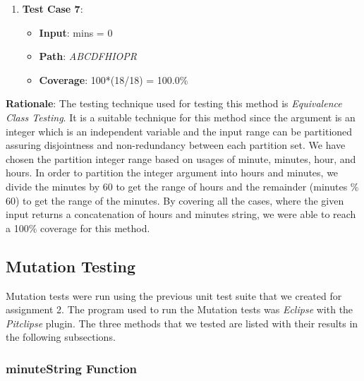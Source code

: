 \documentclass[fontsize=12pt,paper=letter,twoside]{scrartcl}
\begin{document}
\begin{enumerate}
\item \textbf{Test Case 7}:
\begin{itemize}
\item \textbf{Input}: mins = 0
\item \textbf{Path}: \emph{ABCDFHIOPR}
\item \textbf{Coverage}: 100*(18/18) = 100.0\%
\end{itemize}

\end{enumerate}

\noindent \textbf{Rationale}: The testing technique used for testing this method is \emph{Equivalence Class Testing}. It is a suitable technique for this method since the argument is an integer which is an independent variable and the input range can be partitioned assuring disjointness and non-redundancy between each partition set. We have chosen the partition integer range based on usages of minute, minutes, hour, and hours. In order to partition the integer argument into hours and minutes, we divide the minutes by 60 to get the range of hours and the remainder (minutes \% 60) to get the range of the minutes. By covering all the cases, where the given input returns a concatenation of hours and minutes string, we were able to reach a 100\% coverage for this method.

\newpage
\subsection{Mutation Testing}
Mutation tests were run using the previous unit test suite that we created for assignment 2. The program used to run the Mutation tests was \emph{Eclipse} with the \emph{Pitclipse} plugin. The three methods that we tested are listed with their results in the following subsections. 

\subsubsection{minuteString Function}
\end{document}
